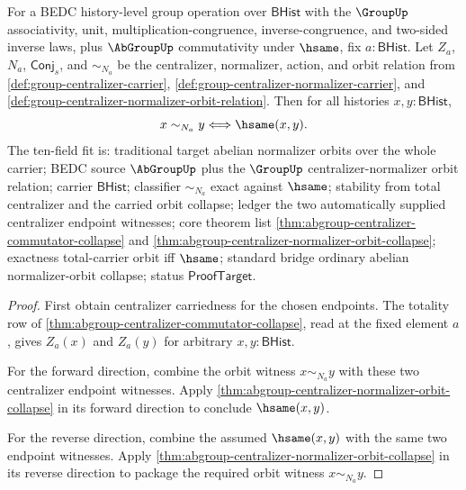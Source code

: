 \begin{theorem}
\label{thm:abgroup-total-centralizer-normalizer-orbit-collapse}
For a BEDC history-level group operation over $\mathsf{BHist}$ with the
$\GroupUp$ associativity, unit, multiplication-congruence,
inverse-congruence, and two-sided inverse laws, plus $\AbGroupUp$
commutativity under $\hsame$, fix $a:\mathsf{BHist}$. Let $Z_a$, $N_a$,
$\mathsf{Conj}_s$, and $\sim_{N_a}$ be the centralizer, normalizer, action,
and orbit relation from \autoref{def:group-centralizer-carrier},
\autoref{def:group-centralizer-normalizer-carrier}, and
\autoref{def:group-centralizer-normalizer-orbit-relation}. Then for all
histories $x,y:\mathsf{BHist}$,
$$
x\sim_{N_a}y \Longleftrightarrow \hsame(x,y).
$$
The ten-field fit is: traditional target abelian normalizer orbits over the
whole carrier; BEDC source $\AbGroupUp$ plus the $\GroupUp$
centralizer-normalizer orbit relation; carrier $\mathsf{BHist}$; classifier
$\sim_{N_a}$ exact against $\hsame$; stability from total centralizer and the
carried orbit collapse; ledger the two automatically supplied centralizer
endpoint witnesses; core theorem list
\autoref{thm:abgroup-centralizer-commutator-collapse} and
\autoref{thm:abgroup-centralizer-normalizer-orbit-collapse}; exactness
total-carrier orbit iff $\hsame$; standard bridge ordinary abelian
normalizer-orbit collapse; status $\mathsf{ProofTarget}$.
\end{theorem}
\begin{proof}
First obtain centralizer carriedness for the chosen endpoints. The totality
row of \autoref{thm:abgroup-centralizer-commutator-collapse}, read at the
fixed element $a$, gives $Z_a(x)$ and $Z_a(y)$ for arbitrary
$x,y:\mathsf{BHist}$.

For the forward direction, combine the orbit witness $x\sim_{N_a}y$ with these
two centralizer endpoint witnesses. Apply
\autoref{thm:abgroup-centralizer-normalizer-orbit-collapse} in its forward
direction to conclude $\hsame(x,y)$.

For the reverse direction, combine the assumed $\hsame(x,y)$ with the same
two endpoint witnesses. Apply
\autoref{thm:abgroup-centralizer-normalizer-orbit-collapse} in its reverse
direction to package the required orbit witness $x\sim_{N_a}y$.
\end{proof}

